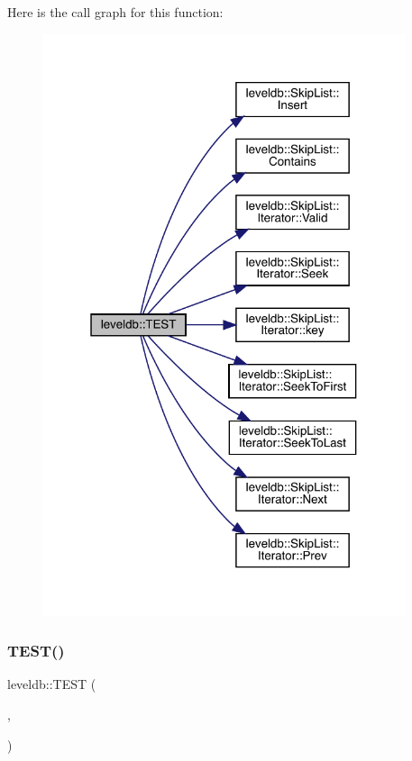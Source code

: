 Here is the call graph for this function\+:
\nopagebreak
\begin{figure}[H]
\begin{center}
\leavevmode
\includegraphics[width=301pt]{namespaceleveldb_a21e74b2de9a6f3db48c8d3ff277a1e0d_cgraph}
\end{center}
\end{figure}
\mbox{\label{namespaceleveldb_a188b103f7d0b4ade94f516f01a09aa06}} 
\subsubsection{\texorpdfstring{TEST()}{TEST()}\hspace{0.1cm}{\footnotesize\ttfamily [6/102]}}
{\footnotesize\ttfamily leveldb\+::\+T\+E\+ST (\begin{DoxyParamCaption}\item[{\mbox{\hyperlink{classleveldb_1_1_find_file_test}{Find\+File\+Test}}}]{,  }\item[{Empty}]{ }\end{DoxyParamCaption})}

